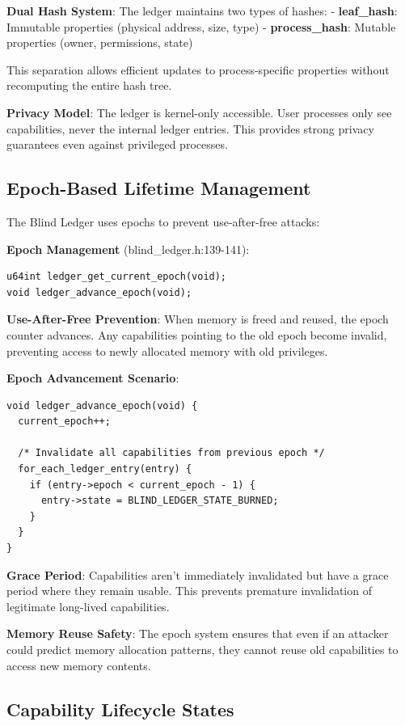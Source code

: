\documentclass[11pt,letterpaper]{article}
\begin{document}
\textbf{Dual Hash System}: The ledger maintains two types of hashes:
- \textbf{leaf\_hash}: Immutable properties (physical address, size, type)
- \textbf{process\_hash}: Mutable properties (owner, permissions, state)

This separation allows efficient updates to process-specific properties without recomputing the entire hash tree.

\textbf{Privacy Model}: The ledger is kernel-only accessible. User processes only see capabilities, never the internal ledger entries. This provides strong privacy guarantees even against privileged processes.

\subsection{Epoch-Based Lifetime Management}

The Blind Ledger uses epochs to prevent use-after-free attacks:

\textbf{Epoch Management} (blind\_ledger.h:139-141):

\begin{lstlisting}
u64int ledger_get_current_epoch(void);
void ledger_advance_epoch(void);
\end{lstlisting}

\textbf{Use-After-Free Prevention}: When memory is freed and reused, the epoch counter advances. Any capabilities pointing to the old epoch become invalid, preventing access to newly allocated memory with old privileges.

\textbf{Epoch Advancement Scenario}:

\begin{lstlisting}
void ledger_advance_epoch(void) {
  current_epoch++;
  
  /* Invalidate all capabilities from previous epoch */
  for_each_ledger_entry(entry) {
    if (entry->epoch < current_epoch - 1) {
      entry->state = BLIND_LEDGER_STATE_BURNED;
    }
  }
}
\end{lstlisting}

\textbf{Grace Period}: Capabilities aren't immediately invalidated but have a grace period where they remain usable. This prevents premature invalidation of legitimate long-lived capabilities.

\textbf{Memory Reuse Safety}: The epoch system ensures that even if an attacker could predict memory allocation patterns, they cannot reuse old capabilities to access new memory contents.

\subsection{Capability Lifecycle States}
\end{document}
